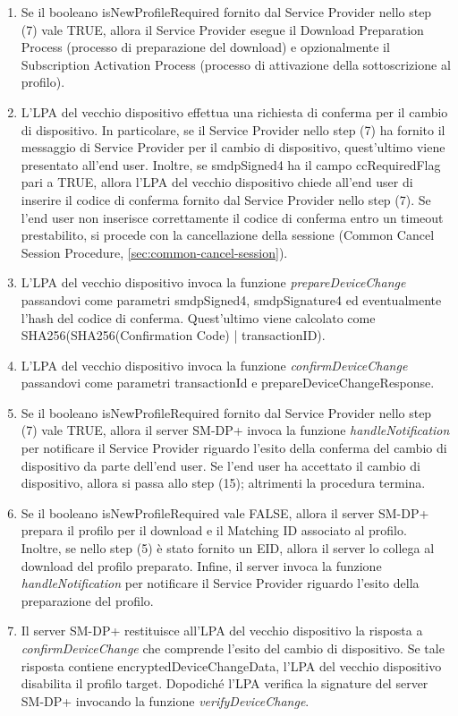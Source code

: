 \documentclass[10pt, oneside]{book}
\begin{document}
\begin{enumerate}
\item Se il booleano isNewProfileRequired fornito dal Service Provider nello step (7) vale TRUE, allora il Service Provider esegue il Download Preparation Process (processo di preparazione del download) e opzionalmente il Subscription Activation Process (processo di attivazione della sottoscrizione al profilo).
\item L'LPA del vecchio dispositivo effettua una richiesta di conferma per il cambio di dispositivo. In particolare, se il Service Provider nello step (7) ha fornito il messaggio di Service Provider per il cambio di dispositivo, quest'ultimo viene presentato all'end user. Inoltre, se smdpSigned4 ha il campo ccRequiredFlag pari a TRUE, allora l'LPA del vecchio dispositivo chiede all'end user di inserire il codice di conferma fornito dal Service Provider nello step (7). Se l'end user non inserisce correttamente il codice di conferma entro un timeout prestabilito, si procede con la cancellazione della sessione (Common Cancel Session Procedure, \ref{sec:common-cancel-session}).
\item L'LPA del vecchio dispositivo invoca la funzione \textit{prepareDeviceChange} passandovi come parametri smdpSigned4, smdpSignature4 ed eventualmente l'hash del codice di conferma. Quest'ultimo viene calcolato come SHA256(SHA256(Confirmation Code) | transactionID).
\item L'LPA del vecchio dispositivo invoca la funzione \textit{confirmDeviceChange} passandovi come parametri transactionId e prepareDeviceChangeResponse.
\item Se il booleano isNewProfileRequired fornito dal Service Provider nello step (7) vale TRUE, allora il server SM-DP+ invoca la funzione \textit{handleNotification} per notificare il Service Provider riguardo l'esito della conferma del cambio di dispositivo da parte dell'end user. Se l'end user ha accettato il cambio di dispositivo, allora si passa allo step (15); altrimenti la procedura termina.
\item Se il booleano isNewProfileRequired vale FALSE, allora il server SM-DP+ prepara il profilo per il download e il Matching ID associato al profilo. Inoltre, se nello step (5) è stato fornito un EID, allora il server lo collega al download del profilo preparato. Infine, il server invoca la funzione \textit{handleNotification} per notificare il Service Provider riguardo l'esito della preparazione del profilo.
\item Il server SM-DP+ restituisce all'LPA del vecchio dispositivo la risposta a \textit{confirmDeviceChange} che comprende l'esito del cambio di dispositivo. Se tale risposta contiene encryptedDeviceChangeData, l'LPA del vecchio dispositivo disabilita il profilo target. Dopodiché l'LPA verifica la signature del server SM-DP+ invocando la funzione \textit{verifyDeviceChange}.

\end{enumerate}
\end{document}
